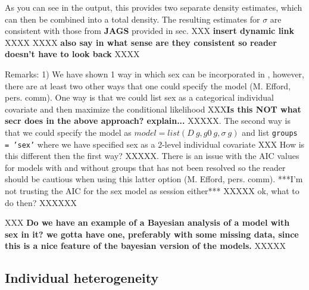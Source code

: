 \begin{comment}
but none XXX {\bf recommend moving this ``but none....''
end of sentence to a general discussion point at the end of this
section} XXXXX
of these allow us to include partial observability.
{\bf not sure what is meant by ``which is different'' clarify
this sentence here and probably this should be moved to the end of the
section as a general discussion point} XXXXXX
from the \textbf{WinBUGS} approach.
\end{comment}

As you can see in the output, this provides two separate density
estimates, which can then be combined into a total density.  The
resulting estimates for $\sigma$ are consistent with those from {\bf JAGS}
provided in sec. XXX {\bf insert dynamic link} XXXX XXXX {\bf also say in what
sense are they consistent so reader doesn't have to look back} XXXX

Remarks: 1) We have shown 1 way in which sex can be incorporated in
\secr, however, there are at least two other ways that one could
specify the model (M. Efford, pers. comm).  One way is that we could
list sex as a categorical individual covariate and then maximize the
conditional likelihood XXX{\bf Is this NOT what secr does in the above
  approach? explain...} XXXXX.  The second way is that we could specify the
model as $model = list(D~g, g0~g, \sigma~g)$ and list \mbox{\tt groups = 'sex'}
where we have specified sex as a 2-level individual covariate XXX How
is this different then the first way? XXXXX.  There
is an issue with the AIC values for models with and without groups
that has not been resolved so the reader should be cautious when using
this latter option (M. Efford, pers. comm).  ***I'm not trusting the
AIC for the sex model as session either*** XXXXX ok, what to do then? XXXXXX


XXX
{\bf Do we have an example of a Bayesian analysis of a model with sex in it?
we gotta have one, preferably with some missing data, since this is a
nice feature of the bayesian version of the models. }
XXXXX


\subsection{Individual heterogeneity}

